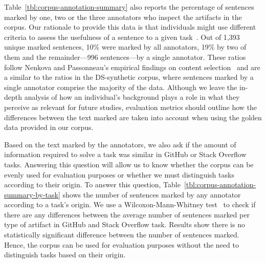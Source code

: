 



Table~\ref{tbl:corpus-annotation-summary} also reports the percentage of sentences marked by one, two or the three annotators who inspect the artifacts in the corpus.
Our rationale to provide this data is that individuals might use different criteria to
assess the usefulness of a sentence to a given task~\cite{Barry1994, Barry1998}.
Out of 1,393
unique marked
sentences, 
10\% were marked by all annotators,
19\% by two of them and the remainder---996 sentences---by a single annotator.
These ratios follow Nenkova and Passonneau's empirical findings on 
content selection~\cite{Nenkova2004}
and are a similar to the ratios in the \acs{DS-synthetic} corpus,
where sentences marked by a single annotator comprise the majority of the data.
Although we leave the in-depth analysis of how an individual's background plays a role in what they perceive as relevant for future studies,  evaluation metrics should outline how 
the differences between the text marked are taken into account when 
using the golden data provided in our corpus. %



Based on the text marked by the annotators,   
we also ask if the amount of information required to solve a task was similar in GitHub or Stack Overflow tasks.
Answering this question will allow us to know whether 
the corpus can be evenly used for evaluation purposes or 
whether we must distinguish tasks according to their origin.
To answer this question, Table~\ref{tbl:corpus-annotation-summary-by-task} shows the number of sentences marked by any annotator according to a task's origin.
We use a Wilcoxon-Mann-Whitney test~\cite{mannWhitneyU} to check if there are any differences between the
average number of sentences marked per type of artifact in GitHub and Stack Overflow task.
Results show there is no statistically significant difference 
between the number of sentences  marked.
Hence, the corpus can be used for evaluation purposes without the need to distinguish tasks based on their origin.













